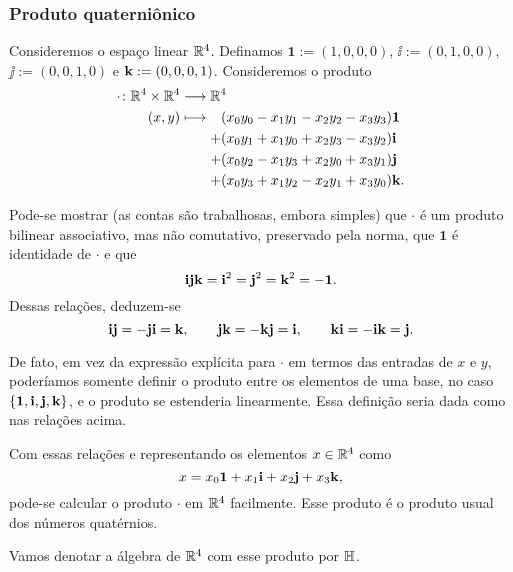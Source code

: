 \subsubsection{Produto quaterniônico}

Consideremos o espaço linear $\mathbb{R}^4$. Definamos $\bm 1 := (1,0,0,0)$, $\bm \ii := (0,1,0,0)$, $\bm \jj := (0,0,1,0)$ e $\bm {\mathrm{k}} := (0,0,0,1)$. Consideremos o produto
	\begin{align*}
	\func{\cdot}{\R^4 \times \R^4}{\R^4}{(x,y)}{
		\begin{aligned}[t]
		&(x_0y_0 - x_1y_1 - x_2y_2 - x_3y_3) \bm 1 \\
			+ &(x_0y_1+x_1y_0+x_2y_3-x_3y_2) \bm\ii \\
			+ &(x_0y_2-x_1y_3+x_2y_0+x_3y_1) \bm\jj \\
			+ &(x_0y_3+x_1y_2-x_2y_1+x_3y_0) \bm\kk .
		\end{aligned}
	}
	\end{align*}

Pode-se mostrar (as contas são trabalhosas, embora simples) que $\cdot$ é um produto bilinear associativo, mas não comutativo, preservado pela norma, que $\bm 1$ é identidade de $\cdot$ e que
	\begin{equation*}
	\bm{\mathrm{i}}\bm{\mathrm{j}}\bm{\mathrm{k}} = \bm{\mathrm{i}}^2 = \bm{\mathrm{j}}^2 = \bm{\mathrm{k}}^2 = -\bm 1.
	\end{equation*}
Dessas relações, deduzem-se
	\begin{equation*}
	\bm{\mathrm{i}}\bm{\mathrm{j}} = -\bm{\mathrm{j}}\bm{\mathrm{i}} = \bm{\mathrm{k}}, \qquad \bm{\mathrm{j}}\bm{\mathrm{k}} = -\bm{\mathrm{k}}\bm{\mathrm{j}} = \bm{\mathrm{i}}, \qquad \bm{\mathrm{k}}\bm{\mathrm{i}} = -\bm{\mathrm{i}}\bm{\mathrm{k}} = \bm{\mathrm{j}}.
	\end{equation*}

De fato, em vez da expressão explícita para $\cdot$ em termos das entradas de $x$ e $y$, poderíamos somente definir o produto entre os elementos de uma base, no caso $\{\bm 1,\bm {\mathrm{i}}, \bm {\mathrm{j}}, \bm {\mathrm{k}}\}$, e o produto se estenderia linearmente. Essa definição seria dada como nas relações acima.

Com essas relações e representando os elementos $x \in \mathbb{R}^4$ como
	\begin{equation*}
	x = x_0\bm 1  + x_1\bm {\mathrm{i}} + x_2 \bm {\mathrm{j}} + x_3 \bm {\mathrm{k}},
	\end{equation*}
pode-se calcular o produto $\cdot$ em $\mathbb{R}^4$ facilmente. Esse produto é o produto usual dos números quatérnios.

Vamos denotar a álgebra de $\mathbb{R}^4$ com esse produto por $\mathbb{H}$.

